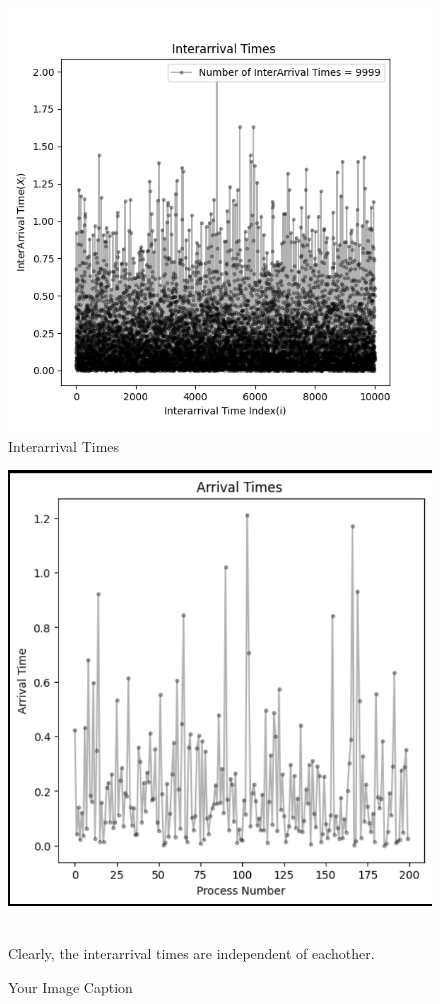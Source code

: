 \documentclass[10pt]{article}
\begin{document}
\begin{figure}
    \centering
    \includegraphics{images/interarrival1.png}
    \caption{Interarrival Times}
    \label{Arrival Times of the Jobs}
\end{figure}
\begin{figure}
    \centering
    \includegraphics[width=1\linewidth]{images/interarrival2.png}
    \caption{Your Image Caption}
    \label{InterArrival Times of the Processes}
    \\
Clearly, the interarrival times are independent of eachother.\\
\end{figure}
\end{document}
